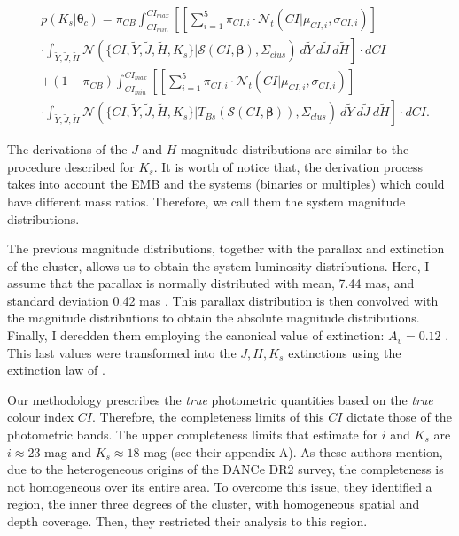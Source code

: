 \begin{align}
&p(K_s | \boldsymbol{\theta}_c)  =   \pi_{CB} \int_{CI_{min}}^{CI_{max}}\left[ \left[\sum_{i=1}^5 \pi_{CI,i} \cdot \mathcal{N}_t(CI| \mu_{CI,i},\sigma_{CI,i})\right]\right. \nonumber \\
&\cdot  \left.\int_{\tilde{Y},\tilde{J},\tilde{H}}\mathcal{N}(\{CI,\tilde{Y},\tilde{J},\tilde{H},K_s\}|\boldsymbol{\mathcal{S}}(CI, \boldsymbol{\beta}),\Sigma_{clus})~d\tilde{Y}~d\tilde{J}~d\tilde{H}\right] \cdot dCI \nonumber \\
& + (1-\pi_{CB}) \int_{CI_{min}}^{CI_{max}}\left[\left[\sum_{i=1}^5 \pi_{CI,i} \cdot \mathcal{N}_t(CI| \mu_{CI,i},\sigma_{CI,i})\right]\right.\nonumber\\
&\cdot \left. \int_{\tilde{Y},\tilde{J},\tilde{H}}\mathcal{N}(\{CI,\tilde{Y},\tilde{J},\tilde{H},K_s\}|T_{Bs}(\boldsymbol{\mathcal{S}}(CI, \boldsymbol{\beta})),\Sigma_{clus})~d\tilde{Y}~d\tilde{J}~d\tilde{H}\right]\cdot dCI. \nonumber 
\end{align}

The derivations of the $J$ and $H$ magnitude distributions are similar to the procedure described for $K_s$. It is worth of notice that, the derivation process takes into account the EMB and the systems (binaries or multiples) which could have different mass ratios. Therefore, we call them the system magnitude distributions. 

The previous magnitude distributions, together with the parallax and extinction of the cluster, allows us to obtain the system luminosity distributions. Here, I assume that the parallax is normally distributed with mean, 7.44 mas, and standard deviation 0.42 mas \citep{Galli2017}. This parallax distribution is then convolved with the magnitude distributions to obtain the absolute magnitude distributions. Finally, I deredden them employing the canonical value of extinction: $A_v=0.12$ \citep{Guthrie1987}. This last values were transformed into the $J,H,K_s$ extinctions using the extinction law of \citet{Cardelli1989}.

Our methodology prescribes the \emph{true} photometric quantities based on the \emph{true} colour index $CI$. Therefore, the completeness limits of this $CI$ dictate those of the photometric bands. The upper completeness limits that \citet{Bouy2015} estimate for $i$ and $K_s$ are $i\approx23$ mag and $K_s\approx18$ mag (see their appendix A). As these authors mention, due to the heterogeneous origins of the DANCe DR2 survey, the completeness is not homogeneous over its entire area. To overcome this issue, they identified a region, the inner three degrees of the cluster, with homogeneous spatial and depth coverage. Then, they restricted their analysis to this region. 

